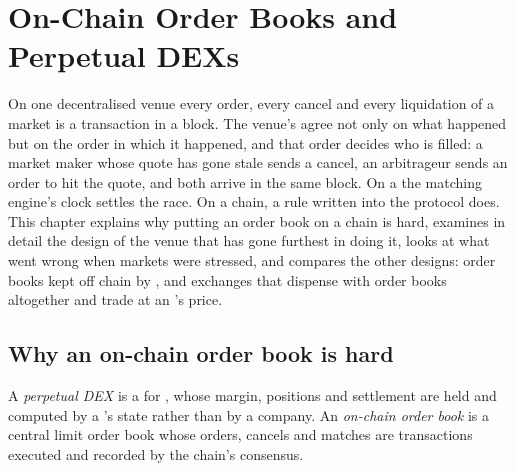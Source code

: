 \chapter{On-Chain Order Books and Perpetual DEXs}\label{ch:m3:on-chain-order-books-and-perpetual-dexs}

On one decentralised venue every order, every cancel and every liquidation of a  market
is a transaction in a block. The venue's  agree not only on what happened but on the order in
which it happened, and that order decides who is filled: a market maker whose quote has gone stale sends a
cancel, an arbitrageur sends an order to hit the quote, and both arrive in the same block. On a
 the matching engine's clock settles the race. On a chain, a rule written into the
protocol does. This chapter explains why putting an order book on a chain is hard, examines in detail the
design of the venue that has gone furthest in doing it, looks at what went wrong when markets were
stressed, and compares the other designs: order books kept off chain by , and exchanges that
dispense with order books altogether and trade at an 's price.

\section{Why an on-chain order book is hard}

\begin{definition}\label{def:m3:on-chain-order-books-and-perpetual-dexs:perpdex}
A \emph{perpetual DEX} is a  for , whose margin,
positions and settlement are held and computed by a 's state rather than by a company. An
\emph{on-chain order book} is a central limit order book whose orders, cancels
and matches are transactions executed and recorded by the chain's consensus.
\end{definition}

